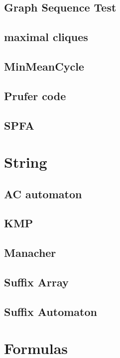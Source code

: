 \subsection{Graph Sequence Test}

\subsection{maximal cliques}

\subsection{MinMeanCycle}

\subsection{Prufer code}

\subsection{SPFA}



\section{String}
\subsection{AC automaton}

\subsection{KMP}

\subsection{Manacher}

\subsection{Suffix Array}

\subsection{Suffix Automaton}


\section{Formulas}

